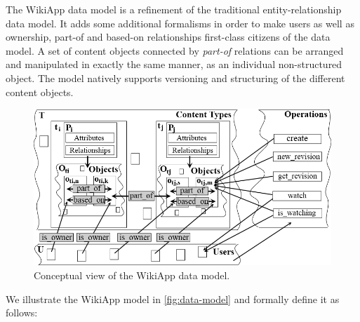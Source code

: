 \documentclass[ngerman,UKenglish,table]{scrbook}
\begin{document}
The WikiApp data model is a refinement of the traditional entity-relationship data model.
It adds some additional formalisms in order to make users as well as ownership, part-of and based-on relationships first-class citizens of the data model.
A set of content objects connected by \emph{part-of} relations can be arranged and manipulated in exactly the same manner, as an individual non-structured object.
The model natively supports versioning and structuring of the different content objects.

\begin{figure}[htb]
	\centering
		\includegraphics[width=\columnwidth]{images/data_model_last.png}
	\caption{Conceptual view of the WikiApp data model.}
	\label{fig:data-model}
\end{figure}

We illustrate the WikiApp model in \autoref{fig:data-model} and formally define it as follows:
\end{document}
